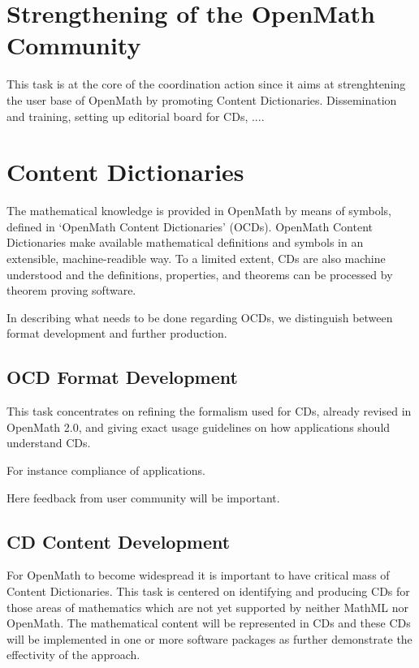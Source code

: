 \documentclass{euproposal}
\begin{document}
\section{Strengthening of the OpenMath Community} 
\label{community}

This task is at the core of the coordination action since it aims at
strenghtening the user base of OpenMath by promoting Content
Dictionaries. Dissemination and training, setting up editorial board
for CDs, ....


\section{Content Dictionaries}
\label{sec:OCD}



The mathematical knowledge is provided in OpenMath by means of symbols,
defined in `OpenMath Content Dictionaries' (OCDs).  
OpenMath Content Dictionaries make available mathematical definitions and
symbols in an extensible, machine-readible way. To a limited extent,
CDs are also machine understood and the definitions, properties, and
theorems can be processed by theorem proving software.

In describing what needs to be done regarding OCDs, we
distinguish between format development and further production.


\subsection{OCD Format Development}
\label{format}
This task concentrates on refining the formalism used for CDs, already revised
in OpenMath 2.0, and giving exact usage guidelines on how applications should
understand CDs.

For instance compliance of applications.



Here feedback from user community will be important.


\subsection{CD Content Development} 
\label{content}
For OpenMath to become widespread it is important to have
critical mass of Content Dictionaries. This task is centered on
identifying and producing CDs for those areas of mathematics which are
not yet supported by neither MathML nor OpenMath. The mathematical
content will be represented in CDs and these CDs will be implemented
in one or more software packages as further demonstrate the
effectivity of the approach. 
\end{document}
